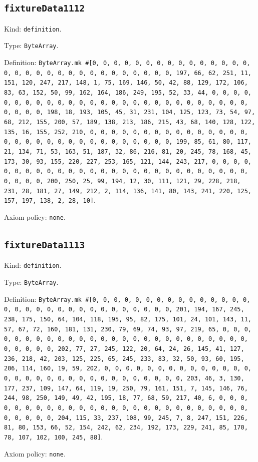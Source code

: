 \documentclass[11pt]{article}
\begin{document}
\subsection*{\texttt{fixtureData1112}}
\noindent Kind: \texttt{definition}.\par
\noindent Type: \texttt{ByteArray}.\par
\noindent Definition: \texttt{ByteArray.mk \#[0, 0, 0, 0, 0, 0, 0, 0, 0, 0, 0, 0, 0, 0, 0, 0, 0, 0, 0, 0, 0, 0, 0, 0, 0, 0, 0, 0, 0, 0, 0, 197, 66, 62, 251, 11, 151, 120, 247, 217, 148, 1, 75, 169, 146, 50, 42, 88, 129, 172, 106, 83, 63, 152, 50, 99, 162, 164, 186, 249, 195, 52, 33, 44, 0, 0, 0, 0, 0, 0, 0, 0, 0, 0, 0, 0, 0, 0, 0, 0, 0, 0, 0, 0, 0, 0, 0, 0, 0, 0, 0, 0, 0, 0, 0, 198, 18, 193, 105, 45, 31, 231, 104, 125, 123, 73, 54, 97, 68, 212, 155, 200, 57, 189, 138, 213, 186, 215, 43, 68, 140, 128, 122, 135, 16, 155, 252, 210, 0, 0, 0, 0, 0, 0, 0, 0, 0, 0, 0, 0, 0, 0, 0, 0, 0, 0, 0, 0, 0, 0, 0, 0, 0, 0, 0, 0, 0, 0, 0, 199, 85, 61, 80, 117, 21, 134, 71, 53, 163, 51, 187, 32, 86, 216, 81, 20, 245, 78, 168, 45, 173, 30, 93, 155, 220, 227, 253, 165, 121, 144, 243, 217, 0, 0, 0, 0, 0, 0, 0, 0, 0, 0, 0, 0, 0, 0, 0, 0, 0, 0, 0, 0, 0, 0, 0, 0, 0, 0, 0, 0, 0, 0, 0, 200, 250, 25, 99, 194, 12, 30, 111, 121, 29, 228, 218, 231, 28, 181, 27, 149, 212, 2, 114, 136, 141, 80, 143, 241, 220, 125, 157, 197, 138, 2, 28, 10]}.\par
\noindent Axiom policy: \texttt{none}.\par
\subsection*{\texttt{fixtureData1113}}
\noindent Kind: \texttt{definition}.\par
\noindent Type: \texttt{ByteArray}.\par
\noindent Definition: \texttt{ByteArray.mk \#[0, 0, 0, 0, 0, 0, 0, 0, 0, 0, 0, 0, 0, 0, 0, 0, 0, 0, 0, 0, 0, 0, 0, 0, 0, 0, 0, 0, 0, 0, 0, 201, 194, 167, 245, 238, 175, 150, 64, 104, 118, 195, 95, 82, 175, 101, 24, 101, 143, 11, 57, 67, 72, 160, 181, 131, 230, 79, 69, 74, 93, 97, 219, 65, 0, 0, 0, 0, 0, 0, 0, 0, 0, 0, 0, 0, 0, 0, 0, 0, 0, 0, 0, 0, 0, 0, 0, 0, 0, 0, 0, 0, 0, 0, 0, 202, 77, 27, 245, 122, 20, 64, 24, 26, 145, 41, 127, 236, 218, 42, 203, 125, 225, 65, 245, 233, 83, 32, 50, 93, 60, 195, 206, 114, 160, 19, 59, 202, 0, 0, 0, 0, 0, 0, 0, 0, 0, 0, 0, 0, 0, 0, 0, 0, 0, 0, 0, 0, 0, 0, 0, 0, 0, 0, 0, 0, 0, 0, 0, 203, 46, 3, 130, 177, 237, 109, 147, 64, 119, 19, 250, 79, 161, 151, 7, 145, 146, 76, 244, 98, 250, 149, 49, 42, 195, 18, 77, 68, 59, 217, 40, 6, 0, 0, 0, 0, 0, 0, 0, 0, 0, 0, 0, 0, 0, 0, 0, 0, 0, 0, 0, 0, 0, 0, 0, 0, 0, 0, 0, 0, 0, 0, 0, 204, 115, 33, 237, 108, 99, 245, 7, 8, 247, 151, 226, 81, 80, 153, 66, 52, 154, 242, 62, 234, 192, 173, 229, 241, 85, 170, 78, 107, 102, 100, 245, 88]}.\par
\noindent Axiom policy: \texttt{none}.\par
\end{document}
